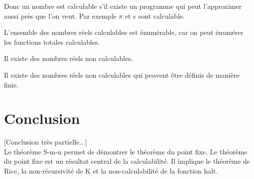 \begin{myrem}
	Donc un nombre est calculable s'il existe un programme qui peut
	l'approximer aussi près que l'on veut. Par exemple $\pi$ et $e$ sont
	calculable.
\end{myrem}

\begin{myprop}
	L'ensemble des nombres réels calculables est énumérable, car on peut énumérer les
	fonctions totales calculables.
\end{myprop}

\begin{myprop}
	Il existe des nombres réels non calculables.
\end{myprop}

\begin{myprop}
	Il existe des nombres réels non calculables qui peuvent être définis de
	manière finie.
\end{myprop}


\section{Conclusion}
[Conclusion très partielle...]\\
Le théorème S-m-n permet de démontrer le théorème du point fixe.
Le théorème du point fixe est un résultat central de la calculabilité. Il
implique le théorème de Rice, la non-récursivité de K et la non-calculabilité
de la fonction halt.


